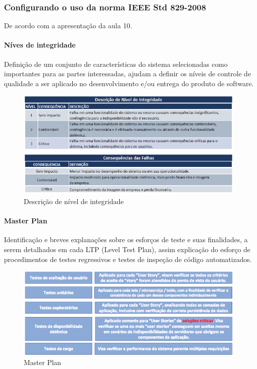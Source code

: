 \subsubsection{Configurando o uso da norma IEEE Std 829-2008 \cite{IEEE829}}

De acordo com a apresentação da aula 10.

\paragraph{Níves de integridade}

Definição de um conjunto de características do sistema selecionadas como importantes para as partes interessadas, ajudam a definir os níveis de controle de qualidade a ser aplicado no desenvolvimento e/ou entrega do produto de software.

\begin{figure}[H]
  \centering
  \includegraphics[width=1\textwidth]{softwareengineer/images/integrity-level} 
  \caption{Descrição de nível de integridade}
  \label{fig:integrity} 
\end{figure}

\paragraph{Master Plan}

Identificação e breves explanações sobre os esforços de teste e suas finalidades, a serem detalhados em cada LTP (Level Test Plan), assim explicação do esforço de procedimentos de testes regressivos e testes de inspeção de código automatizados.

\begin{figure}[H]
  \centering
  \includegraphics[width=1\textwidth]{softwareengineer/images/master-plan} 
  \caption{Master Plan}
  \label{fig:masterplan} 
\end{figure}


